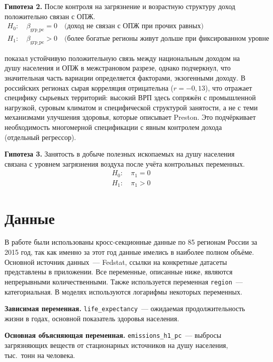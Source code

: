 \documentclass[11pt,a4paper]{article}
\begin{document}
\textbf{Гипотеза 2.} После контроля на загрязнение и возрастную структуру доход положительно связан с ОПЖ.
\begin{align*}
H_0\colon\ & \beta_{\text{grp\_pc}} = 0 \quad \text{(доход не связан с ОПЖ при прочих равных)}\\
H_1\colon\ & \beta_{\text{grp\_pc}} > 0 \quad \text{(более богатые регионы живут дольше при фиксированном уровне загрязнения)}
\end{align*}

\citet{preston1975} показал устойчивую положительную связь между национальным доходом на душу населения и ОПЖ в межстрановом разрезе, однако подчеркнул, что значительная часть вариации определяется факторами, экзогенными доходу. В российских регионах сырая корреляция отрицательна ($r = -0{,}13$), что отражает специфику сырьевых территорий: высокий ВРП здесь сопряжён с промышленной нагрузкой, суровым климатом и специфической структурой занятости, а не с теми механизмами улучшения здоровья, которые описывает Preston. Это подчёркивает необходимость многомерной спецификации с явным контролем дохода (отдельный регрессор).

\textbf{Гипотеза 3.} Занятость в добыче полезных ископаемых на душу населения связана с уровнем загрязнения воздуха после учёта контрольных переменных.
\begin{align*}
H_0\colon\ & \pi_1 = 0\\
H_1\colon\ & \pi_1 > 0
\end{align*}

\section*{Данные}

В работе были использованы кросс-секционные данные по 85 регионам России за 2015 год, так как именно за этот год данные имелись в наиболее полном объёме. Основной источник данных~--- Fedstat, ссылки на конкретные датасеты представлены в приложении. Все переменные, описанные ниже, являются непрерывными количественными. Также используется переменная \texttt{region}~--- категориальная. В моделях используются логарифмы некоторых переменных.

\textbf{Зависимая переменная.} \texttt{life\_expectancy}~--- ожидаемая продолжительность жизни в годах, основной показатель здоровья населения.

\textbf{Основная объясняющая переменная.} \texttt{emissions\_h1\_pc}~--- выбросы загрязняющих веществ от стационарных источников на душу населения, тыс.~тонн на человека.
\end{document}
